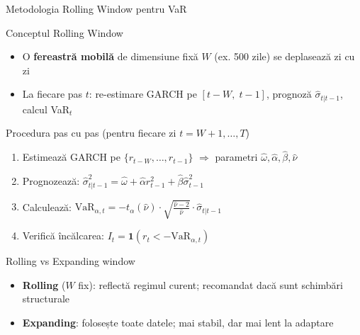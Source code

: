 \documentclass[9pt, aspectratio=169, t]{beamer}
\begin{document}
\begin{frame}{Metodologia Rolling Window pentru VaR}
    \small
        \vspace{-0.2cm}
        \begin{block}{Conceptul Rolling Window}
            \begin{itemize}
                \item O \textbf{fereastră mobilă} de dimensiune fixă $W$ (ex. 500 zile) se deplasează zi cu zi
                \item La fiecare pas $t$: re-estimare GARCH pe $[t-W,\; t-1]$, prognoză $\hat{\sigma}_{t|t-1}$, calcul VaR$_t$
            \end{itemize}
        \end{block}
        \vspace{-0.2cm}
        \begin{exampleblock}{Procedura pas cu pas (pentru fiecare zi $t = W+1, \ldots, T$)}
            \begin{enumerate}
                \item Estimează GARCH pe $\{r_{t-W}, \ldots, r_{t-1}\}$ $\Rightarrow$ parametri $\hat{\omega}, \hat{\alpha}, \hat{\beta}, \hat{\nu}$
                \item Prognozează: $\hat{\sigma}_{t|t-1}^2 = \hat{\omega} + \hat{\alpha} r_{t-1}^2 + \hat{\beta} \hat{\sigma}_{t-1}^2$
                \item Calculează: $\text{VaR}_{\alpha,t} = -t_{\alpha}(\hat{\nu}) \cdot \sqrt{\frac{\hat{\nu}-2}{\hat{\nu}}} \cdot \hat{\sigma}_{t|t-1}$
                \item Verifică încălcarea: $I_t = \mathbf{1}(r_t < -\text{VaR}_{\alpha,t})$
            \end{enumerate}
        \end{exampleblock}
        \vspace{-0.2cm}
        \begin{alertblock}{Rolling vs Expanding window}
            \begin{itemize}
                \item \textbf{Rolling} ($W$ fix): reflectă regimul curent; recomandat dacă sunt schimbări structurale
                \item \textbf{Expanding}: folosește toate datele; mai stabil, dar mai lent la adaptare
            \end{itemize}
        \end{alertblock}
\end{frame}
\end{document}

